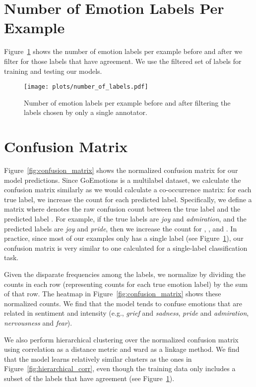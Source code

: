 \documentclass[11pt,a4paper]{article}
\begin{document}
\section{Number of Emotion Labels Per Example}
\label{sec:modeling_plots}

Figure~\ref{fig:num_labels} shows the number of emotion labels per example before and after we filter for those labels that have agreement. We use the filtered set of labels for training and testing our models.

\begin{figure}[h]
 \centering
   \centering
   \texttt{[image: plots/number\_of\_labels.pdf]}
   \caption{Number of emotion labels per example before and after filtering the labels chosen by only a single annotator.}
   \label{fig:num_labels}
\end{figure}

\section{Confusion Matrix}
\label{sec:appendix_confusion_matrix}

Figure~\ref{fig:confusion_matrix} shows the normalized confusion matrix for our model predictions. Since GoEmotions is a multilabel dataset, we calculate the confusion matrix similarly as we would calculate a co-occurrence matrix: for each true label, we increase the count for each predicted label. Specifically, we define a matrix  where  denotes the raw confusion count between the true label  and the predicted label . For example, if the true labels are \emph{joy} and \emph{admiration}, and the predicted labels are \emph{joy} and \emph{pride}, then we increase the count for , ,  and . In practice, since most of our examples only has a single label (see Figure~\ref{fig:num_labels}), our confusion matrix is very similar to one calculated for a single-label classification task.

Given the disparate frequencies among the labels, we normalize  by dividing the counts in each row (representing counts for each true emotion label) by the sum of that row. The heatmap in Figure~\ref{fig:confusion_matrix} shows these normalized counts. We find that the model tends to confuse emotions that are related in sentiment and intensity (e.g., \emph{grief} and \emph{sadness}, \emph{pride} and \emph{admiration}, \emph{nervousness} and \emph{fear}).

We also perform hierarchical clustering over the normalized confusion matrix using correlation as a distance metric and ward as a linkage method. We find that the model learns relatively similar clusters as the ones in Figure~\ref{fig:hierarchical_corr}, even though the training data only includes a subset of the labels that have agreement (see Figure~\ref{fig:num_labels}).
\end{document}
